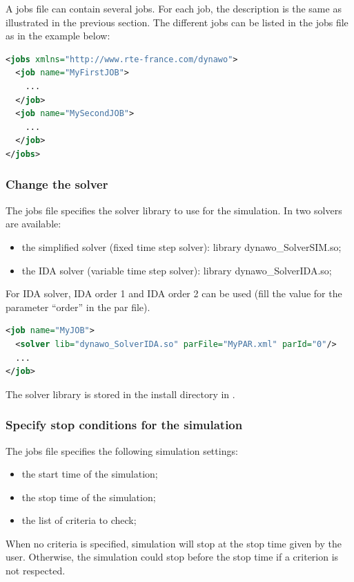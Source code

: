 \documentclass[a4paper, 12pt]{report}
\begin{document}
A jobs file can contain several jobs. For each job, the description is the same as illustrated in the previous section. The different jobs can be listed in the jobs file as in the example below:

\begin{lstlisting}[language=XML, morekeywords={name}]
<jobs xmlns="http://www.rte-france.com/dynawo">
  <job name="MyFirstJOB">
    ...
  </job>
  <job name="MySecondJOB">
    ...
  </job>
</jobs>
\end{lstlisting}

\subsubsection{Change the solver}

The jobs file specifies the solver library to use for the simulation. In \Dynawo two solvers are available:
\begin{itemize}
\item the simplified solver (fixed time step solver): library dynawo\_SolverSIM.so;
\item the IDA solver (variable time step solver): library dynawo\_SolverIDA.so;
\end{itemize}

For IDA solver, IDA order 1 and IDA order 2 can be used (fill the value for the parameter ``order'' in the par file).

\begin{lstlisting}[language=XML, morekeywords={lib}]
<job name="MyJOB">
  <solver lib="dynawo_SolverIDA.so" parFile="MyPAR.xml" parId="0"/>
  ...
</job>
\end{lstlisting}

The solver library is stored in the install directory in .

\subsubsection{Specify stop conditions for the simulation}

The jobs file specifies the following simulation settings:
\begin{itemize}
\item the start time of the simulation;
\item the stop time of the simulation;
\item the list of criteria to check;
\end{itemize}

When no criteria is specified, simulation will stop at the stop time given by
the user. Otherwise, the simulation could stop before the stop
time if a criterion is not respected.
\end{document}
